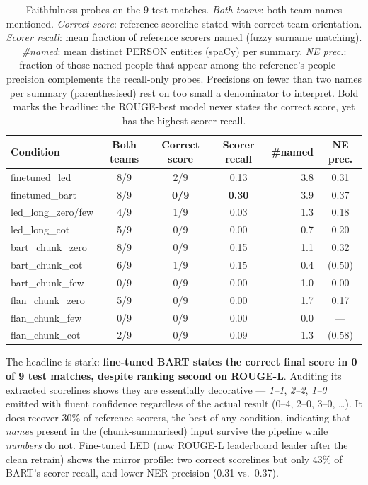 \documentclass[10pt,a4paper]{article}
\begin{document}
\begin{table}[h]
\centering\small
\begin{tabular}{lcccrc}
\toprule
\textbf{Condition} & \textbf{Both teams} & \textbf{Correct score} & \textbf{Scorer recall} & \textbf{\#named} & \textbf{NE prec.} \\
\midrule
finetuned\_led    & 8/9 & 2/9 & 0.13 & 3.8 & 0.31 \\
finetuned\_bart   & 8/9 & \textbf{0/9} & \textbf{0.30} & 3.9 & 0.37 \\
led\_long\_zero/few & 4/9 & 1/9 & 0.03 & 1.3 & 0.18 \\
led\_long\_cot    & 5/9 & 0/9 & 0.00 & 0.7 & 0.20 \\
bart\_chunk\_zero & 8/9 & 0/9 & 0.15 & 1.1 & 0.32 \\
bart\_chunk\_cot  & 6/9 & 1/9 & 0.15 & 0.4 & (0.50) \\
bart\_chunk\_few  & 0/9 & 0/9 & 0.00 & 1.0 & 0.00 \\
flan\_chunk\_zero & 5/9 & 0/9 & 0.00 & 1.7 & 0.17 \\
flan\_chunk\_few  & 0/9 & 0/9 & 0.00 & 0.0 & --- \\
flan\_chunk\_cot  & 2/9 & 0/9 & 0.09 & 1.3 & (0.58) \\
\bottomrule
\end{tabular}
\caption{Faithfulness probes on the 9 test matches. \emph{Both teams}: both team names mentioned. \emph{Correct score}: reference scoreline stated with correct team orientation. \emph{Scorer recall}: mean fraction of reference scorers named (fuzzy surname matching). \emph{\#named}: mean distinct PERSON entities (spaCy) per summary. \emph{NE prec.}: fraction of those named people that appear among the reference's people --- precision complements the recall-only probes. Precisions on fewer than two names per summary (parenthesised) rest on too small a denominator to interpret. Bold marks the headline: the ROUGE-best model never states the correct score, yet has the highest scorer recall.}
\label{tab:faith}
\end{table}

The headline is stark: \textbf{fine-tuned BART states the correct final score in 0 of 9 test matches, despite ranking second on ROUGE-L}. Auditing its extracted scorelines shows they are essentially decorative --- \emph{1--1}, \emph{2--2}, \emph{1--0} emitted with fluent confidence regardless of the actual result (0--4, 2--0, 3--0, \dots). It does recover 30\% of reference scorers, the best of any condition, indicating that \emph{names} present in the (chunk-summarised) input survive the pipeline while \emph{numbers} do not. Fine-tuned LED (now ROUGE-L leaderboard leader after the clean retrain) shows the mirror profile: two correct scorelines but only 43\% of BART's scorer recall, and lower NER precision (0.31 vs.\ 0.37).
\end{document}
